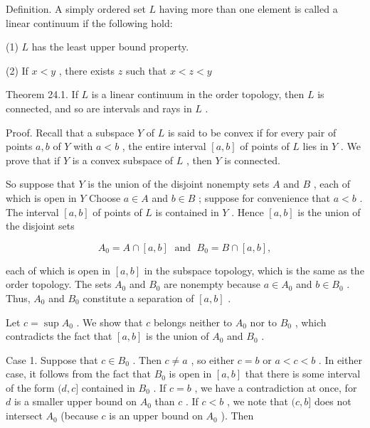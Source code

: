 Definition. A simply ordered set \(L\) having more than one element is called a linear continuum if the following hold:

(1) \(L\) has the least upper bound property.

(2) If \(x < y\) , there exists \(z\) such that \(x < z < y\)

Theorem 24.1. If \(L\) is a linear continuum in the order topology, then \(L\) is connected, and so are intervals and rays in \(L\) .

Proof. Recall that a subspace \(Y\) of \(L\) is said to be convex if for every pair of points \(a,b\) of \(Y\) with \(a < b\) , the entire interval \(\left\lbrack  {a,b}\right\rbrack\) of points of \(L\) lies in \(Y\) . We prove that if \(Y\) is a convex subspace of \(L\) , then \(Y\) is connected.

So suppose that \(Y\) is the union of the disjoint nonempty sets \(A\) and \(B\) , each of which is open in \(Y\) Choose \(a \in  A\) and \(b \in  B\) ; suppose for convenience that \(a < b\) . The interval \(\left\lbrack  {a,b}\right\rbrack\) of points of \(L\) is contained in \(Y\) . Hence \(\left\lbrack  {a,b}\right\rbrack\) is the union of the disjoint sets

\[
{A}_{0} = A \cap  \left\lbrack  {a,b}\right\rbrack  \;\text{ and }\;{B}_{0} = B \cap  \left\lbrack  {a,b}\right\rbrack  ,
\]

each of which is open in \(\left\lbrack  {a,b}\right\rbrack\) in the subspace topology, which is the same as the order topology. The sets \({A}_{0}\) and \({B}_{0}\) are nonempty because \(a \in  {A}_{0}\) and \(b \in  {B}_{0}\) . Thus, \({A}_{0}\) and \({B}_{0}\) constitute a separation of \(\left\lbrack  {a,b}\right\rbrack\) .

Let \(c = \sup {A}_{0}\) . We show that \(c\) belongs neither to \({A}_{0}\) nor to \({B}_{0}\) , which contradicts the fact that \(\left\lbrack  {a,b}\right\rbrack\) is the union of \({A}_{0}\) and \({B}_{0}\) .

Case 1. Suppose that \(c \in  {B}_{0}\) . Then \(c \neq  a\) , so either \(c = b\) or \(a < c < b\) . In either case, it follows from the fact that \({B}_{0}\) is open in \(\left\lbrack  {a,b}\right\rbrack\) that there is some interval of the form \((d,c\rbrack\) contained in \({B}_{0}\) . If \(c = b\) , we have a contradiction at once, for \(d\) is a smaller upper bound on \({A}_{0}\) than \(c\) . If \(c < b\) , we note that \((c,b\rbrack\) does not intersect \({A}_{0}\) (because \(c\) is an upper bound on \({A}_{0}\) ). Then

